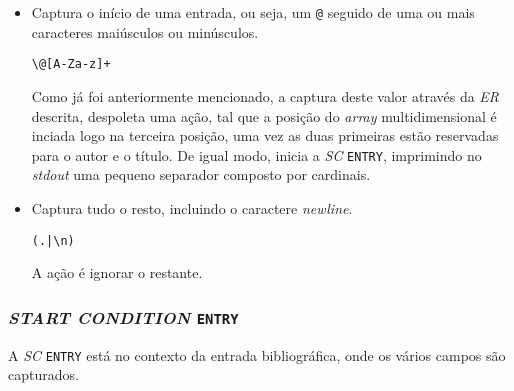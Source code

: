 \begin{itemize}

	\item Captura o início de uma entrada, ou seja, um \texttt{@} seguido de uma
		ou mais caracteres maiúsculos ou minúsculos.

\begin{verbatim}
\@[A-Za-z]+
\end{verbatim}

Como já foi anteriormente mencionado, a captura deste valor através da
\emph{ER} descrita, despoleta uma ação, tal que a posição do \emph{array}
multidimensional é inciada logo na terceira posição, uma vez as duas primeiras
estão reservadas para o autor e o título. De igual modo, inicia a \emph{SC}
\texttt{ENTRY}, imprimindo no \emph{stdout} uma pequeno separador composto por
cardinais.

\item Captura tudo o resto, incluindo o caractere \emph{newline}.

\begin{verbatim}
(.|\n)                            
\end{verbatim}

A ação é ignorar o restante.



\end{itemize}



\subsubsection{\emph{START CONDITION} \texttt{ENTRY}}

A \emph{SC} \texttt{ENTRY} está no contexto da entrada bibliográfica, onde os
vários campos são capturados. 

